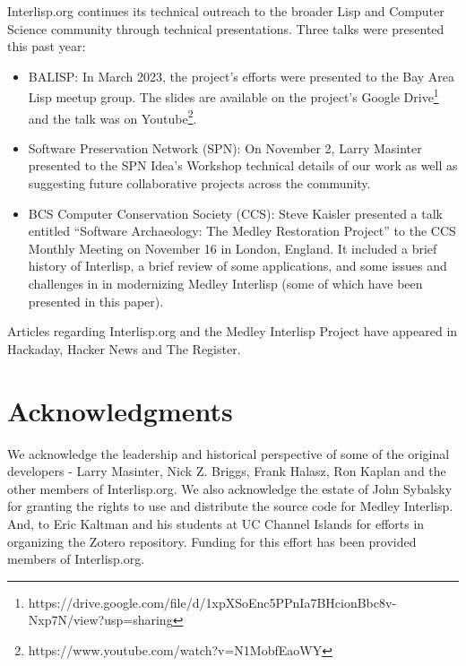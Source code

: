 \documentclass[sigconf]{acmart}
\begin{document}
Interlisp.org continues its technical outreach to the broader Lisp and Computer Science community through technical presentations. Three talks were presented this past year:
\begin{itemize}
    \item BALISP: In March 2023, the project's efforts were presented to the Bay Area Lisp meetup group. The slides are available on the project's Google Drive\footnote{https://drive.google.com/file/d/1xpXSoEnc5PPnIa7BHcionBbc8v-Nxp7N/view?usp=sharing} and the talk was on Youtube\footnote{https://www.youtube.com/watch?v=N1MobfEaoWY}.
    \item Software Preservation Network (SPN): On November 2, Larry Masinter presented to the SPN Idea's Workshop technical details of our work as well as suggesting future collaborative projects across the community.
    \item BCS Computer Conservation Society (CCS): Steve Kaisler presented a talk entitled “Software Archaeology: The Medley Restoration Project” to the CCS Monthly Meeting on November 16 in London, England. It included a brief history of Interlisp, a brief review of some applications, and some issues and challenges in in modernizing Medley Interlisp (some of which have been presented in this paper).
\end{itemize}

Articles regarding Interlisp.org and the Medley Interlisp Project have appeared in Hackaday, Hacker News and The Register\cite{Proven23}.

\section*{Acknowledgments}

We acknowledge the leadership and historical perspective of some of the original developers - Larry Masinter, Nick Z. Briggs, Frank Halasz, Ron Kaplan and the other members of Interlisp.org. We also acknowledge the estate of John Sybalsky for granting the rights to use and distribute the source code for Medley Interlisp. And, to Eric Kaltman and his students at UC Channel Islands for efforts in organizing the Zotero repository. Funding for this effort has been provided members of Interlisp.org.



\end{document}
